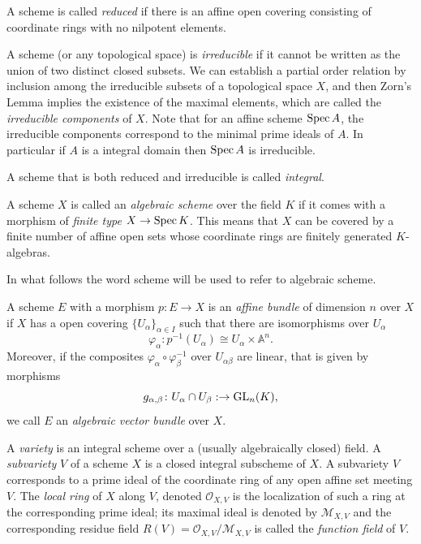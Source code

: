 \documentclass[a4paper,openany]{scrbook}
\begin{document}
A scheme is called \emph{reduced} if there is an affine open covering consisting of coordinate rings with no nilpotent elements.

A scheme (or any topological space) is \emph{irreducible} if it cannot be written as the union of two distinct closed subsets. We can establish a partial order relation by inclusion among the irreducible subsets of a topological space $X$, and then Zorn's Lemma implies the existence of the maximal elements, which are called the \emph{irreducible components} of $X$. Note that for an affine scheme $\operatorname{Spec} A$, the irreducible components correspond to the minimal prime ideals of $A$. In particular if $A$ is a integral domain then $\operatorname{Spec} A$ is irreducible.

A scheme that is both reduced and irreducible is called \emph{integral}.

A scheme $X$ is called an \emph{algebraic scheme} over the field $K$ if it comes with a morphism of \emph{finite type} $X \to \operatorname{Spec} K$. This means that $X$ can be covered by a finite number of affine open sets whose coordinate rings are finitely generated $K$-algebras.

In what follows the word scheme will be used to refer to algebraic scheme.

\begin{defn}
 A scheme $E$ with a morphism $p\colon E\to X$ is an \emph{affine bundle} of dimension $n$ over $X$ if $X$ has a open covering $\{U_\alpha\}_{\alpha \in I}$ such that there are isomorphisms over $U_\alpha$
 \[\varphi_\alpha\colon p^{-1}(U_\alpha) \cong U_\alpha\times \mathbb A^n.\]
 Moreover, if  the composites $\varphi_\alpha\circ \varphi_\beta^{-1}$ over $U_{\alpha\beta}$ are linear, that is given by morphisms
 \[
 g_{\alpha,\beta}\colon U_\alpha\cap U_\beta:\to \operatorname{GL}_n(K),
 \]
 we call $E$ an \emph{algebraic vector bundle} over $X$.
\end{defn}

A \emph{variety} is an integral scheme over a (usually algebraically closed) field. A \emph{subvariety} $V$ of a scheme $X$ is a closed integral subscheme of $X$. A subvariety $V$ corresponds to a prime ideal of the coordinate ring of any open affine set meeting $V$. The \emph{local ring} of $X$ along $V$, denoted $\mathcal O_{X,V}$ is the localization of such a ring at the corresponding prime ideal; its maximal ideal is denoted by $\mathcal M_{X,V}$ and the corresponding residue field $R(V)=\mathcal O_{X,V}/\mathcal M_{X,V}$ is called the \emph{function field} of $V$. 
\end{document}
